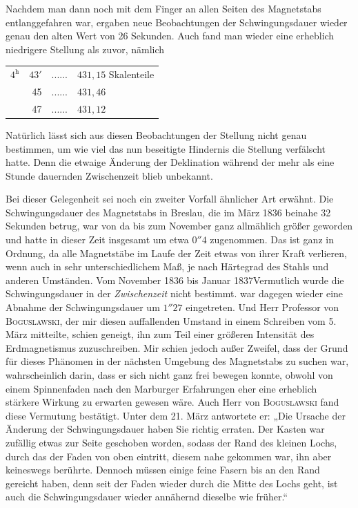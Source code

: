 Nachdem man dann noch mit dem Finger an allen Seiten des Magnetstabs entlanggefahren war, ergaben neue Beobachtungen der Schwingungsdauer wieder genau den alten Wert von 26 Sekunden. Auch fand man wieder eine erheblich niedrigere Stellung als zuvor, nämlich
\begin{center}
\begin{tabular}{rrc l}
$4^{\mathrm h}$&$43'$&.\quad.\quad.\quad.\quad.\quad.&$431{,}15$ Skalenteile\\
&45&.\quad.\quad.\quad.\quad.\quad.&$431{,}46$\\
&47&.\quad.\quad.\quad.\quad.\quad.&$431{,}12$
\end{tabular}
\end{center}
Natürlich lässt sich aus diesen Beobachtungen der Stellung nicht genau bestimmen, um wie viel das nun beseitigte Hindernis die Stellung verfälscht hatte. Denn die etwaige Änderung der Deklination während der mehr als eine Stunde dauernden Zwischenzeit blieb unbekannt.

Bei dieser Gelegenheit sei noch ein zweiter Vorfall ähnlicher Art erwähnt. Die Schwingungsdauer des Magnetstabs in Breslau, die im März 1836 beinahe 32 Sekunden betrug, war von da bis zum November ganz allmählich größer geworden und hatte in dieser Zeit insgesamt um etwa $0''4$ zugenommen. Das ist ganz in Ordnung, da alle Magnetstäbe im Laufe der Zeit etwas von ihrer Kraft verlieren, wenn auch in sehr unterschiedlichem Maß, je nach Härtegrad des Stahls und anderen Umständen. Vom November 1836 bis Januar 1837\expandafter\def\csname HistoricalNoteText577\endcsname{Vermutlich wurde die Schwingungsdauer in der \textit{Zwischenzeit} nicht bestimmt.} war dagegen wieder eine
Abnahme der Schwingungsdauer um $1''27$ eingetreten. Und Herr Professor von \textsc{Boguslawski}, der mir diesen auffallenden Umstand in einem Schreiben vom 5. März mitteilte, schien geneigt, ihn zum Teil einer größeren Intensität des Erdmagnetismus zuzuschreiben. Mir schien jedoch außer Zweifel, dass der Grund für dieses Phänomen in der nächsten Umgebung des Magnetstabs zu suchen war, wahrscheinlich darin, dass er sich nicht ganz frei bewegen konnte, obwohl von einem Spinnenfaden nach den Marburger Erfahrungen eher eine erheblich stärkere Wirkung zu erwarten gewesen wäre. Auch Herr von \textsc{Boguslawski} fand diese Vermutung bestätigt. Unter dem 21. März antwortete er: „Die Ursache der Änderung der Schwingungsdauer haben Sie richtig erraten. Der Kasten war zufällig etwas zur Seite geschoben worden, sodass der Rand des kleinen Lochs, durch das der Faden von oben eintritt, diesem nahe gekommen war, ihn aber keineswegs berührte. Dennoch müssen einige feine Fasern bis an den Rand gereicht haben, denn seit der Faden wieder durch die Mitte des Lochs geht, ist auch die Schwingungsdauer wieder annähernd dieselbe wie früher.“

